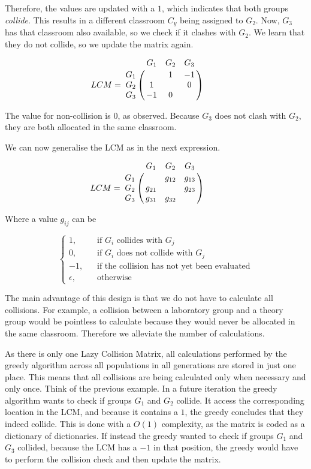Therefore, the values are updated with a $1$, which indicates that both groups \textit{collide}. This results in a different classroom $C_{y}$ being assigned to $G_{2}$. Now, $G_{3}$ has that classroom also available, so we check if it clashes with $G_{2}$. We learn that they do not collide, so we update the matrix again.

\begin{equation}
    LCM = \bordermatrix{
        & G_{1} & G_{2} & G_{3} \cr
        G_{1} &  & 1 & -1 \cr
        G_{2} & 1 &  & 0 \cr
        G_{3} & -1 & 0 & 
    } \qquad
\end{equation}

The value for non-collision is $0$, as observed. Because $G_{3}$ does not clash with $G_{2}$, they are both allocated in the same classroom.

We can now generalise the LCM as in the next expression.

\begin{equation}
    LCM = \bordermatrix{
        & G_{1} & G_{2} & G_{3} \cr
        G_{1} &  & g_{12} & g_{13} \cr
        G_{2} & g_{21} &  & g_{23} \cr
        G_{3} & g_{31} & g_{32} & 
    } \qquad
\end{equation}

Where a value $g_{ij}$ can be

\[
    \begin{cases}
        1\text{,} &\quad\text{if $G_{i}$ collides with $G_{j}$}\\
        0\text{,} &\quad\text{if $G_{i}$ does not collide with $G_{j}$}\\
        -1\text{,} &\quad\text{if the collision has not yet been evaluated}\\
        \epsilon\text{,} &\quad\text{otherwise}
    \end{cases}
\]

The main advantage of this design is that we do not have to calculate all collisions. For example, a collision between a laboratory group and a theory group would be pointless to calculate because they would never be allocated in the same classroom. Therefore we alleviate the number of calculations. 

As there is only one Lazy Collision Matrix, all calculations performed by the greedy algorithm across all populations in all generations are stored in just one place. This means that all collisions are being calculated only when necessary and only once. Think of the previous example. In a future iteration the greedy algorithm wants to check if groups $G_{1}$ and $G_{2}$ collide. It access the corresponding location in the LCM, and because it contains a $1$, the greedy concludes that they indeed collide. This is done with a $O(1)$ complexity, as the matrix is coded as a dictionary of dictionaries. If instead the greedy wanted to check if groups $G_{1}$ and $G_{3}$ collided, because the LCM has a $-1$ in that position, the greedy would have to perform the collision check and then update the matrix.



